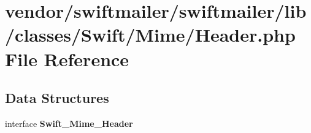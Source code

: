 \section{vendor/swiftmailer/swiftmailer/lib/classes/\+Swift/\+Mime/\+Header.php File Reference}
\label{_header_8php}
\subsection*{Data Structures}
\begin{DoxyCompactItemize}
\item 
interface {\bf Swift\+\_\+\+Mime\+\_\+\+Header}
\end{DoxyCompactItemize}
